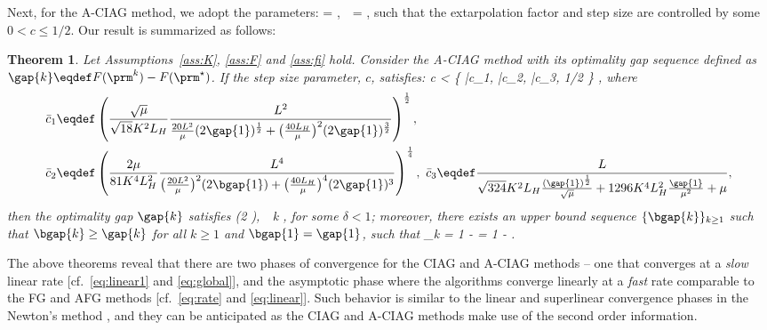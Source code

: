 \documentclass[smallextended]{svjour3}       %
\newtheorem{Theorem}{Theorem}
\begin{document}
Next, for the {\sf A-CIAG} method, we adopt the parameters:
\beq \label{eq:param}
\alpha = ,~~\gamma =  \eqs,
\eeq
such that the extarpolation factor and step size are controlled by some $ 0  < c \leq 1/2$. 
Our result is summarized as follows: 
\begin{Theorem} \label{thm:main}
Let Assumptions~\ref{ass:K}, \ref{ass:F} and \ref{ass:fi} hold. Consider the {\sf A-CIAG} method 
with its optimality gap sequence defined as $\gap{k} \eqdef F( \prm^k ) - F(\prm^\star)$. 
If the step size parameter, $c$, satisfies:
\beq \label{eq:stepsize}
c < \min \left\{ \bar{c}_1, \bar{c}_2, \bar{c}_3, 1/2 \right\} \eqs,
\eeq 
where
\begin{align}
& \bar{c}_1 \eqdef \left( \frac{\sqrt{\mu}}{ \sqrt{18} K^2 L_H} \frac{L^2}{ \frac{20L^2}{\mu} (2 \gap{1})^{\frac{1}{2}} +  \big( \frac{40L_H}{\mu} \big)^2 (2 \gap{1})^{\frac{3}{2}} }  \right)^{\frac{1}{2}} \label{eq:c_aciag} ,\\
& \bar{c}_2 \eqdef \left( \frac{2\mu}{ 81 K^4 L_H^2} 
\frac{L^4}{ \big(\frac{20L^2}{\mu}\big)^2 (2 \bgap{1} ) +  \big( \frac{40L_H}{\mu} \big)^4 (2 \gap{1})^3 } \right)^{\frac{1}{4}},~ \bar{c}_3 \eqdef 
\frac{L}{\sqrt{324}  K^2 L_H \frac{(\gap{1})^{\frac{1}{2}}}{\sqrt{\mu}}
+ 1296 K^4 L_H^2 \frac{\gap{1}}{\mu^2} + \mu} , \notag
\end{align}
then the optimality gap $\gap{k}$ satisfies
\beq \label{eq:global}
  (2 ),~\forall~k  \eqs,
\eeq
for some $\delta < 1$; moreover, there exists an upper bound sequence
$\{ \bgap{k} \}_{k \geq 1}$ 
such that $\bgap{k} \geq \gap{k}$ for all $k \geq 1$ and $\bgap{1} = \gap{1}$, such that
\beq \label{eq:linear}
\lim_{k \rightarrow \infty}  = 1 - \sqrt{\mu \gamma} = 1 -  \eqs.
\eeq
\end{Theorem}
The above theorems reveal that there are two phases of convergence for the {\sf CIAG} and
{\sf A-CIAG} methods -- one that converges at a \emph{slow} linear rate 
[cf.~\eqref{eq:linear1} and \eqref{eq:global}], and the asymptotic phase
where the algorithms converge linearly at a \emph{fast} rate 
comparable to the {\sf FG} and {\sf AFG} methods [cf.~\eqref{eq:rate} and \eqref{eq:linear}]. 
Such behavior is similar to  
the linear and superlinear convergence phases in the
Newton's method \cite{bertsekas1999nonlinear}, and 
they can be anticipated as the {\sf CIAG} and {\sf A-CIAG}
methods make use of the second order information. 
\end{document}
